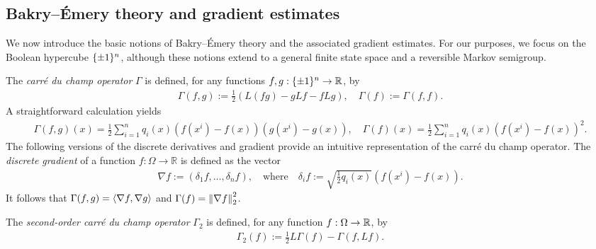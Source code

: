 \subsection{Bakry--\'Emery theory and gradient estimates}
We now introduce the basic notions of Bakry--\'Emery theory and the associated gradient estimates. For our purposes, we focus on the Boolean hypercube $\{\pm 1\}^n$, although these notions extend to a general finite state space and a reversible Markov semigroup. 

The \textit{carr\'e du champ operator} $\Gamma$ is defined, for any functions $f,g:\{\pm 1\}^n \to \mathbb{R}$, by
\begin{align*}
    \Gamma(f,g) := \frac 12 (L(fg)-gLf-fLg), \quad \Gamma(f) := \Gamma(f,f).
\end{align*}
A straightforward calculation yields
\begin{align*}
    \Gamma(f,g)(x) = \frac 12\sum_{i=1}^n q_i(x)(f(x^i) - f(x))(g(x^i) - g(x)),
    \quad \Gamma(f)(x) = \frac 12\sum_{i=1}^n q_i(x)(f(x^i) - f(x))^2.
\end{align*}
The following versions of the discrete derivatives and gradient provide an intuitive representation of the carr\'e du champ operator.
The \textit{discrete gradient} of a function $f: \Omega \to \mathbb{R}$ is defined as the vector 
\begin{align*}
    \nabla f := (\delta_1 f, \ldots, \delta_n f),\quad \text{where} \quad \delta_i f := \sqrt{\frac 12 q_i(x)}(f(x^i) - f(x)).
\end{align*}
It follows that $\Gamma(f,g) = \left\langle \nabla f,\nabla g\right\rangle$ and $\Gamma(f) = \left\lVert \nabla f \right\rVert_2^2$.

The \textit{second-order carr\'e du champ operator} $\Gamma_2$ is defined, for any function $f:\Omega \to \mathbb{R}$, by
\begin{align*}
    \Gamma_2(f) := \frac 12 L\Gamma(f) - \Gamma(f,Lf).
\end{align*}

